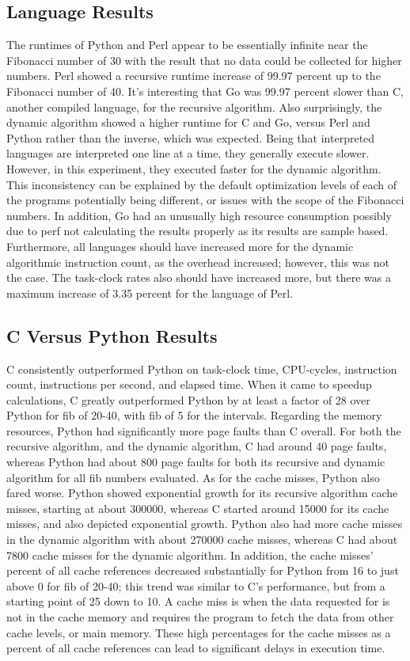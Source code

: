 \documentclass{sig-alternate}
\begin{document}
\subsection{Language Results}
The runtimes of Python and Perl appear to be essentially infinite near the Fibonacci number of 30 with the result that no data could be collected for higher numbers. Perl showed a recursive runtime increase of 99.97 percent up to the Fibonacci number of 40. It’s interesting that Go was 99.97 percent slower than C, another compiled language, for the recursive algorithm. Also surprisingly, the dynamic algorithm showed a higher runtime for C and Go, versus Perl and Python rather than the inverse, which was expected. Being that interpreted languages are interpreted one line at a time, they generally execute slower. However, in this experiment, they executed faster for the dynamic algorithm. This inconsistency can be explained by the default optimization levels of each of the programs potentially being different, or issues with the scope of the Fibonacci numbers. In addition, Go had an unusually high resource consumption possibly due to perf not calculating the results properly as its results are sample based. Furthermore, all languages should have increased more for the dynamic algorithmic instruction count, as the overhead increased; however, this was not the case. The task-clock rates also should have increased more, but there was a maximum increase of 3.35 percent for the language of Perl.

\subsection{C Versus Python Results}
C consistently outperformed Python on task-clock time, CPU-cycles, instruction count, instructions per second, and elapsed time. When it came to speedup calculations, C greatly outperformed Python by at least a factor of 28 over Python for fib of 20-40, with fib of 5 for the intervals. Regarding the memory resources, Python had significantly more page faults than C overall. For both the recursive algorithm, and the dynamic algorithm, C had around 40 page faults, whereas Python had about 800 page faults for both its recursive and dynamic algorithm for all fib numbers evaluated. As for the cache misses, Python also fared worse. Python showed exponential growth for its recursive algorithm cache misses, starting at about 300000, whereas C started around 15000 for its cache misses, and also depicted exponential growth. Python also had more cache misses in the dynamic algorithm with about 270000 cache misses, whereas C had about 7800 cache misses for the dynamic algorithm. In addition, the cache misses’ percent of all cache references decreased substantially for Python from 16 to just above 0 for fib of 20-40; this trend was similar to C’s performance, but from a starting point of 25 down to 10. A cache miss is when the data requested for is not in the cache memory and requires the program to fetch the data from other cache levels, or main memory. These high percentages for the cache misses as a percent of all cache references can lead to significant delays in execution time.
\end{document}
